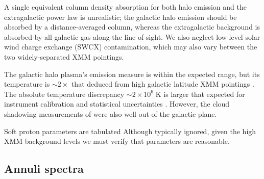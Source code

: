 \documentclass[preprint2,tighten,trackchanges]{aastex6}
\newcommand*{\mt}{\mathrm}
\newcommand*{\unit}[1]{\;\mt{#1}}  %
\newcommand*{\abt}{\mathord{\sim}} %
\begin{document}
A single equivalent column density absorption for both halo emission and the
extragalactic power law is unrealistic;
the galactic halo emission should be absorbed by a distance-averaged column,
whereas the extragalactic background is absorbed by all galactic gas along the
line of sight.
We also neglect low-level solar wind charge exchange (SWCX) contamination,
which may also vary between the two widely-separated XMM pointings.

The galactic halo plasma's emission measure is within the expected range, but
its temperature is $\abt 2\times$ that deduced from high galactic
latitude XMM pointings \citep{henley2013}.
The absolute temperature discrepancy $\abt 2 \times 10^6 \unit{K}$ is larger
that expected for instrument calibration and statistical uncertainties
\citep{henley2015}.
However, the cloud shadowing measurements of \citet{henley2015} were also well
out of the galactic plane.

Soft proton parameters are tabulated
Although typically ignored, given the high XMM background levels we must verify
that parameters are reasonable.

\subsection{Annuli spectra}

\begin{figure*}[]
    \label{fig:fiveann-regs}  %
\end{figure*}
\end{document}
